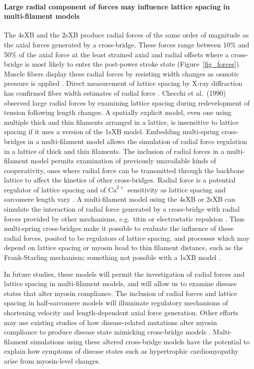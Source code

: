 \documentclass[10pt]{article}
\newcommand{\citep}[1]{\cite{#1}} %
\begin{document}
\paragraph{Large radial component of forces may influence lattice spacing in multi-filament models} %
The 4sXB and the 2sXB produce radial forces of the same order of magnitude as the axial forces generated by a cross-bridge. 
These forces range between 10\% and 50\% of the axial force at the least strained axial and radial offsets where a cross-bridge is most likely to enter the post-power stroke state (Figure~\ref{fig_forces}).
Muscle fibers display these radial forces by resisting width changes as osmotic pressure is applied \citep{Maughan1981}.
Direct measurement of lattice spacing by X-ray diffraction has confirmed fiber width estimates of radial force \citep{Matsubara1984}.
Checchi et al.~(1990) \citep{Cecchi1990} observed large radial forces by examining lattice spacing during redevelopment of tension following length changes. 
A spatially explicit model, even one using multiple thick and thin filaments arranged in a lattice, is insensitive to lattice spacing if it uses a version of the 1sXB model.  
Embedding multi-spring cross-bridges in a multi-filament model allows the simulation of radial force regulation in a lattice of thick and thin filaments.  
The inclusion of radial forces in a multi-filament model permits examination of previously unavailable kinds of cooperativity, ones where radial force can be transmitted through the backbone lattice to affect the kinetics of other cross-bridges. 
Radial force is a potential regulator of lattice spacing and of $\mathrm{Ca}^{2+}$ sensitivity as lattice spacing and sarcomere length vary \citep{Millman1998}.  
A multi-filament model using the 4sXB or 2sXB can simulate the interaction of radial force generated by a cross-bridge with radial forces provided by other mechanisms, e.g.\ titin or electrostatic repulsion \citep{Martyn2004, Cazorla2001, Millman1998}. 
Thus multi-spring cross-bridges make it possible to evaluate the influence of these radial forces, posited to be regulators of lattice spacing, and processes which may depend on lattice spacing or myosin head to thin filament distance, such as the Frank-Starling mechanism; something not possible with a 1sXB model \citep{Smith2009}. 

In future studies, these models will permit the investigation of radial forces and lattice spacing in multi-filament models, and will allow us to examine disease states that alter myosin compliance. 
The inclusion of radial forces and lattice spacing in half-sarcomere models will illuminate regulatory mechanisms of shortening velocity and length-dependent axial force generation. 
Other efforts may use existing studies of how disease-related mutations alter myosin compliance to produce disease state mimicking cross-bridge models \citep{Seebohm2009}. 
Multi-filament simulations using these altered cross-bridge models have the potential to explain how symptoms of disease states such as hypertrophic cardiomyopathy arise from myosin-level changes. 
\end{document}
